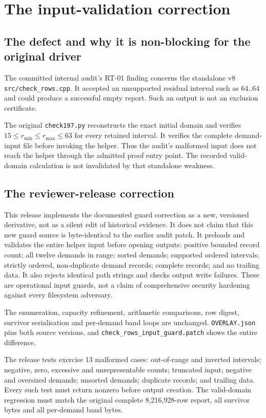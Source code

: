 \documentclass[11pt,a4paper]{article}
\begin{document}
\section{The input-validation correction}
\subsection{The defect and why it is non-blocking for the original driver}
The committed internal audit's RT-01 finding concerns the standalone v8 \texttt{src/check\_rows.cpp}. It accepted an unsupported residual interval such as $64..64$ and could produce a successful empty report. Such an output is not an exclusion certificate.

The original \texttt{check197.py} reconstructs the exact initial domain and verifies $15\le r_{\min}\le r_{\max}\le63$ for every retained interval. It verifies the complete demand-input file before invoking the helper. Thus the audit's malformed input does not reach the helper through the admitted proof entry point. The recorded valid-domain calculation is not invalidated by that standalone weakness.

\subsection{The reviewer-release correction}
This release implements the documented guard correction as a new, versioned derivative, not as a silent edit of historical evidence. It does not claim that this new guard source is byte-identical to the earlier audit patch. It preloads and validates the entire helper input before opening outputs: positive bounded record count; all twelve demands in range; sorted demands; supported ordered intervals; strictly ordered, non-duplicate demand records; complete records; and no trailing data. It also rejects identical path strings and checks output write failures. These are operational input guards, not a claim of comprehensive security hardening against every filesystem adversary.

The enumeration, capacity refinement, arithmetic comparisons, row digest, survivor serialisation and per-demand band loops are unchanged. \texttt{OVERLAY.json} pins both source versions, and \texttt{check\_rows\_input\_guard.patch} shows the entire difference.

The release tests exercise 13 malformed cases: out-of-range and inverted intervals; negative, zero, excessive and unrepresentable counts; truncated input; negative and oversized demands; unsorted demands; duplicate records; and trailing data. Every such test must return nonzero before output creation. The valid-domain regression must match the original complete 8,216,928-row report, all survivor bytes and all per-demand band bytes.
\end{document}
